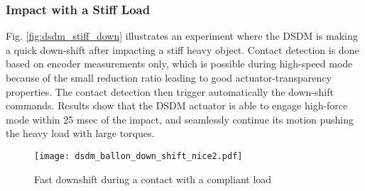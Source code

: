 %
%

%
%



\subsubsection{Impact with a Stiff Load}

Fig. \ref{fig:dsdm_stiff_down} illustrates an experiment where the DSDM is making a quick down-shift after impacting a stiff heavy object. Contact detection is done based on encoder measurements only, which is possible during high-speed mode because of the small reduction ratio leading to good actuator-transparency properties. The contact detection then trigger automatically the down-shift commands. Results show that the DSDM actuator is able to engage high-force mode within 25 msec of the impact, and seamlessly continue its motion pushing the heavy load with large torques. 

\begin{figure}[p]
	\centering
		\texttt{[image: dsdm\_ballon\_down\_shift\_nice2.pdf]}
	\caption{ Fast downshift during a contact with a compliant load }
	\label{fig:dsdm_ballon_down_shift_nice2}
\end{figure}

